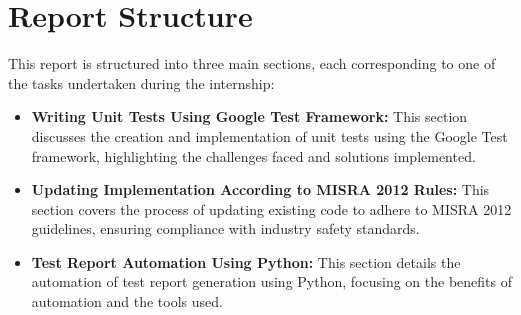 \section{Report Structure}
This report is structured into three main sections, each corresponding to one of the tasks undertaken during the internship:
\begin{itemize}
    \item \textbf{Writing Unit Tests Using Google Test Framework:} This section discusses the creation and implementation of unit tests using the Google Test framework, highlighting the challenges faced and solutions implemented.
    \item \textbf{Updating Implementation According to MISRA 2012 Rules:} This section covers the process of updating existing code to adhere to MISRA 2012 guidelines, ensuring compliance with industry safety standards.
    \item \textbf{Test Report Automation Using Python:} This section details the automation of test report generation using Python, focusing on the benefits of automation and the tools used.
\end{itemize}
